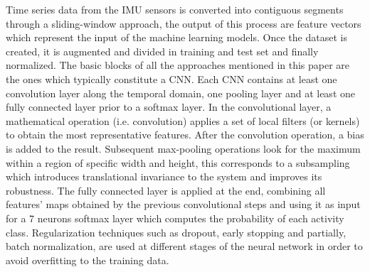 Time series data from the IMU sensors is converted into contiguous segments through a \mbox{sliding-window} approach, the output of this process are feature vectors which represent the input of the machine learning models. Once the dataset is created, it is augmented and divided in training and test set and finally normalized. The basic blocks of all the approaches mentioned in this paper are the ones which typically constitute a CNN. Each CNN contains at least one convolution layer along the temporal domain, one pooling layer and at least one fully connected layer prior to a softmax layer. In the convolutional layer, a mathematical operation (i.e. convolution) applies a set of local filters (or kernels) to obtain the most representative features. After the convolution operation, a bias is added to the result. Subsequent \mbox{max-pooling} operations look for the maximum within a region of specific width and height, this corresponds to a subsampling which introduces translational invariance to the system and improves its robustness. The fully connected layer is applied at the end, combining all features' maps obtained by the previous convolutional steps and using it as input for a 7 neurons softmax layer which computes the probability of each activity class. Regularization techniques such as dropout, early stopping and partially, batch normalization, are used at different stages of the neural network in order to avoid overfitting to the training data. \par
